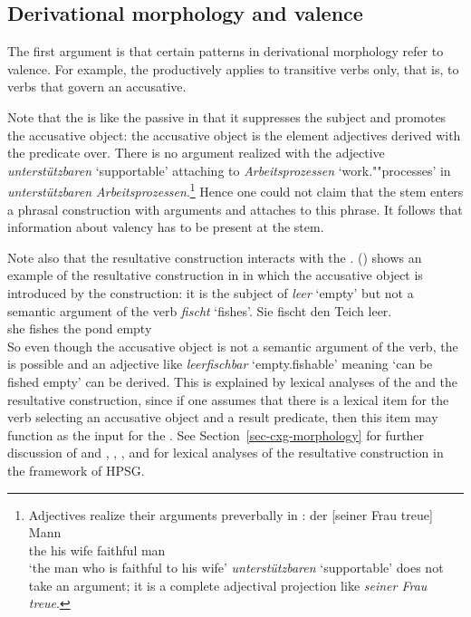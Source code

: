 \documentclass[output=paper
	        ,collection
	        ,collectionchapter
 	        ,biblatex
                ,babelshorthands
                ,newtxmath
                ,draftmode
                ,colorlinks, citecolor=brown
]{langscibook}
\begin{document}
\subsection{Derivational morphology and valence} 

The first argument \citep[Section~5.5.1]{MuellerGT-Eng1} is that certain patterns in derivational morphology refer to valence. For
example, the \bard productively applies to transitive verbs only, that is, to verbs that govern an accusative.
\eal
{}
\zl
\begin{sloppypar}
\noindent
Note that the \bard is like the passive in that it suppresses the subject and promotes the accusative object: the
accusative object is the element adjectives derived with the \bard predicate over. There is no argument
realized with the adjective \emph{unterstützbaren} `supportable' attaching to \emph{Arbeitsprozessen} `work.""processes' in \emph{unterstützbaren
  Arbeitsprozessen}.\footnote{
Adjectives realize their arguments preverbally in :
\ea
\gll der [seiner Frau treue] Mann\\
     the \spacebr{}his wife faithful man\\
\glt `the man who is faithful to his wife'
\z
\emph{unterstützbaren} `supportable' does not take an argument; it is a complete adjectival projection like \emph{seiner Frau treue}.
}  Hence one could not claim that the stem enters a phrasal construction with arguments and
 attaches to this phrase. It follows that information about valency has to be present at
the stem. 
\end{sloppypar}

Note also that the resultative construction interacts with the \bard. () shows an example of the resultative
construction in  in which the accusative object is introduced by the construction: it is the subject of
\emph{leer} `empty' but not a semantic argument of the verb \emph{fischt} `fishes'.
\ea
\gll Sie fischt den Teich leer.\\
     she fishes the pond empty\\
\z
So even though the accusative object is not a semantic argument of the verb, the \bard is possible
and an adjective like \emph{leerfischbar} `empty.fishable' meaning `can be fished empty' can be derived. This is explained by lexical analyses of
the \bard and the resultative construction, since if one assumes that there is a lexical item for
the verb  selecting an accusative object and a result predicate, then this item may function as
the input for the \bard. See Section~\ref{sec-cxg-morphology} for further discussion of \bard and
 , , , and  for lexical analyses of the resultative construction in the framework of HPSG.
\end{document}
